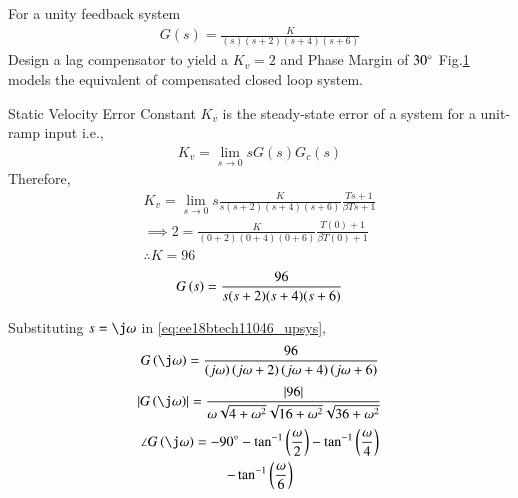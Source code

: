 \item For a unity feedback system 
\begin{align}
G(s) = \frac{K}{(s)(s+2)(s+4)(s+6)}
\label{eq:ee18btech11046_system}
\end{align}
Design a lag compensator to yield a $K_{v}=2$ and Phase Margin of $30\degree$
%
\solution Fig.\ref{fig:ee18btech11046_flow} models the equivalent of compensated closed loop system. 
 \begin{figure}[!ht]
	\begin{center}
		\resizebox{\columnwidth}{!}{}
	\end{center}
\caption{}
\label{fig:ee18btech11046_flow}
\end{figure}

%
Static Velocity Error Constant $K_{v}$ is the steady-state error of a system for a unit-ramp input i.e.,
\begin{align}
K_{v}=\lim _{s \rightarrow 0} s G(s) G_{c}(s)
\label{eq:ee18btech11046_compansatedsys}
\end{align}
Therefore,
\begin{multline}
K_{v}=\lim _{s \rightarrow 0} s \frac{K}{s(s+2)(s+4)(s+6)} \frac{Ts+1}{\beta Ts+1}
\\
\implies 
2 = \frac{K}{(0+2)(0+4)(0+6)} \frac{T(0)+1}{\beta T(0)+1}
\\
\therefore 
K = 96
\end{multline}
\begin{align}
G\left(s\right)=\frac{96}{s(s+2)(s+4)(s+6)}
\label{eq:ee18btech11046_upsys}
\end{align}


Substituting $s = \j\omega$ in \eqref{eq:ee18btech11046_upsys},
\begin{multline}
G\brak{\j\omega} =\frac{96}{\brak{j\omega}\brak{j\omega+2}\brak{j\omega+4}\brak{j\omega+6}} 
\end{multline}
\begin{multline}
\abs{G\brak{\j\omega}} = \frac{\abs{96}}{\omega\sqrt{4+\omega^2}\sqrt{16+\omega^2}\sqrt{36+\omega^2}}
\label{eq:ee18btech11046_gain}
\end{multline}
\begin{multline}
\angle G\brak{\j\omega} = -90\degree -\tan^{-1}\brak{\frac{\omega}{2}}  - \tan^{-1}\brak{\frac{\omega}{4}} \\-  \tan^{-1}\brak{\frac{\omega}{6}} 
\label{eq:ee18btech11046_phase}
\end{multline}

